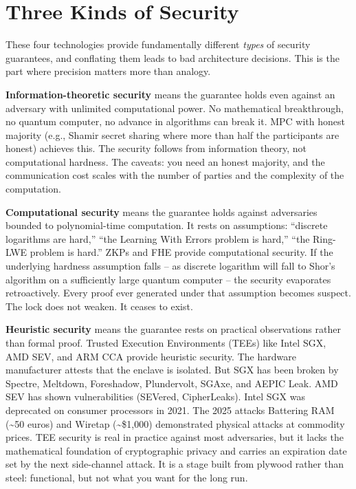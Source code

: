 \documentclass[
  11pt,
  openany]{report}
\renewcommand{\textbf}[1]{{\bfseries\color{MidnightBold}#1}}
\begin{document}
\section{Three Kinds of Security}\label{three-kinds-of-security}

These four technologies provide fundamentally different \emph{types} of security
guarantees, and conflating them leads to bad architecture decisions. This is the
part where precision matters more than analogy.

\textbf{Information-theoretic security} means the guarantee holds even against
an adversary with unlimited computational power. No mathematical breakthrough,
no quantum computer, no advance in algorithms can break it. MPC with honest
majority (e.g., Shamir secret sharing where more than half the participants are
honest) achieves this. The security follows from information theory, not
computational hardness. The caveats: you need an honest majority, and the
communication cost scales with the number of parties and the complexity of the
computation.

\textbf{Computational security} means the guarantee holds against adversaries
bounded to polynomial-time computation. It rests on assumptions: ``discrete
logarithms are hard,'' ``the Learning With Errors problem is hard,'' ``the
Ring-LWE problem is hard.'' ZKPs and FHE provide computational security. If the
underlying hardness assumption falls -- as discrete logarithm will fall to
Shor's algorithm on a sufficiently large quantum computer -- the security
evaporates retroactively. Every proof ever generated under that assumption
becomes suspect. The lock does not weaken. It ceases to exist.

\textbf{Heuristic security} means the guarantee rests on practical observations
rather than formal proof. Trusted Execution Environments (TEEs) like Intel SGX,
AMD SEV, and ARM CCA provide heuristic security. The hardware manufacturer
attests that the enclave is isolated. But SGX has been broken by Spectre,
Meltdown, Foreshadow, Plundervolt, SGAxe, and AEPIC Leak. AMD SEV has shown
vulnerabilities (SEVered, CipherLeaks). Intel SGX was deprecated on consumer
processors in 2021. The 2025 attacks Battering RAM (\textasciitilde50 euros) and
Wiretap (\textasciitilde\$1,000) demonstrated physical attacks at commodity
prices. TEE security is real in practice against most adversaries, but it lacks
the mathematical foundation of cryptographic privacy and carries an expiration
date set by the next side-channel attack. It is a stage built from plywood
rather than steel: functional, but not what you want for the long run.
\end{document}
